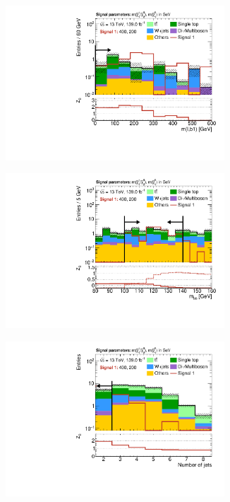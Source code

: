 \begin{figure}
\begin{subfigure}[b]{0.5\linewidth}
	\end{subfigure}\hfill
	\begin{subfigure}[b]{0.5\linewidth}
		\centering\includegraphics[width=0.9\textwidth]{N-1_cut_scan/n1_400_200/mlb1}
	\end{subfigure}\hfill
	\begin{subfigure}[b]{0.5\linewidth}
		\centering\includegraphics[width=0.9\textwidth]{N-1_cut_scan/n1_400_200/mbb_both}
	\end{subfigure}\hfill
	\begin{subfigure}[b]{0.5\linewidth}
		\centering\includegraphics[width=0.9\textwidth]{N-1_cut_scan/n1_400_200/nJet30}
	\end{subfigure}


\end{figure}
